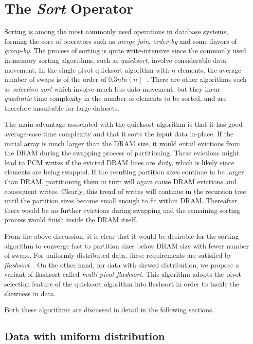 \section{The \emph{Sort} Operator} \label{sort}

Sorting is among the most commonly used operations in database systems, forming
the core of operators such as \emph{merge join}, \emph{order-by} and some
flavors of \emph{group-by}.  The process of sorting is quite write-intensive
since the commonly used in-memory sorting algorithms, such as
\textit{quicksort}, involve considerable data movement. In the single pivot
quicksort algorithm with $n$ elements, the average number of swaps is of the
order of $0.3nln(n)$~\cite{swaps}. There are other algorithms such as
\emph{selection sort} which involve much less data movement, but they incur
\emph{quadratic} time complexity in the number of elements to be sorted, and are
therefore unsuitable for large datasets.

The main advantage associated with the quicksort algorithm is that it has good
average-case time complexity and that it sorts the input data in-place. If the
initial array is much larger than the DRAM size, it would entail evictions from
the DRAM during the swapping process of partitioning. These evictions might lead
to PCM writes if the evicted DRAM lines are \textit{dirty}, which is likely
since elements are being swapped. If the resulting partition sizes continue to
be larger than DRAM, partitioning them in turn will again cause DRAM evictions
and consequent writes. Clearly, this trend of writes will continue in the
recursion tree until the partition sizes become small enough to fit within DRAM.
Thereafter, there would be no further evictions during swapping and the
remaining sorting process would finish inside the DRAM itself.

From the above discussion, it is clear that it would be desirable for the
sorting algorithm to converge fast to partition sizes below DRAM size with
fewer number of swaps. For uniformly-distributed data, these requirements are
satisfied by \emph{flashsort}~\cite{flashsort}. On the other hand, for data with
skewed distribution, we propose a variant of flashsort called \emph{multi-pivot
flashsort}. This algorithm adopts the pivot selection feature of the quicksort 
algorithm into flashsort in order to tackle the skewness in data.

Both these algorithms are discussed in detail in the following sections. 

\subsection{Data with uniform distribution}\label{sort_uniform} 

